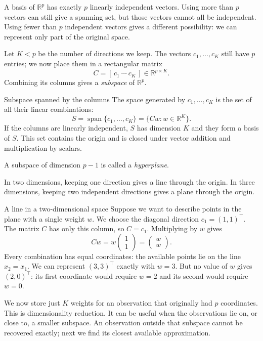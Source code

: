 \documentclass[a4paper,12pt,oneside]{report}
\begin{document}
A basis of $\mathbb{R}^p$ has exactly $p$ linearly independent vectors.
Using more than $p$ vectors can still give a spanning set, but those
vectors cannot all be independent. Using fewer than $p$ independent
vectors gives a different possibility: we can represent only part of
the original space.

Let $K<p$ be the number of directions we keep. The vectors
$c_1,\ldots,c_K$ still have $p$ entries; we now place them in a
rectangular matrix
\[
  C=[\,c_1\ \cdots\ c_K\,]\in\mathbb{R}^{p\times K}.
\]
Combining its columns gives a \emph{subspace} of $\mathbb{R}^p$.

\begin{frameddefn}{Subspace spanned by the columns}\label{def:column-subspace}
The space generated by $c_1,\ldots,c_K$ is the set of all their linear
combinations:
\[
  S=\operatorname{span}\{c_1,\ldots,c_K\}
   =\{Cw:w\in\mathbb{R}^K\}.
\]
If the columns are linearly independent, $S$ has dimension $K$ and they
form a basis of $S$. This set contains the origin and is closed under
vector addition and multiplication by scalars.

A subspace of dimension $p-1$ is called a \emph{hyperplane}.
\end{frameddefn}

In two dimensions, keeping one direction gives a line through the
origin. In three dimensions, keeping two independent directions gives
a plane through the origin.

\begin{framedexample}{A line in a two-dimensional space}
Suppose we want to describe points in the plane with a single weight
$w$. We choose the diagonal direction $c_1=(1,1)^\top$. The matrix
$C$ has only this column, so $C=c_1$. Multiplying by $w$ gives
\[
  Cw=w\begin{pmatrix}1\\1\end{pmatrix}
     =\begin{pmatrix}w\\w\end{pmatrix}.
\]
Every combination has equal coordinates: the available points lie on
the line $x_2=x_1$. We can represent $(3,3)^\top$ exactly with $w=3$.
But no value of $w$ gives $(2,0)^\top$: its first coordinate would
require $w=2$ and its second would require $w=0$.
\end{framedexample}

We now store just $K$ weights for an observation that originally had
$p$ coordinates. This is dimensionality reduction. It can be useful
when the observations lie on, or close to, a smaller subspace. An
observation outside that subspace cannot be recovered exactly; next
we find its closest available approximation.
\end{document}
